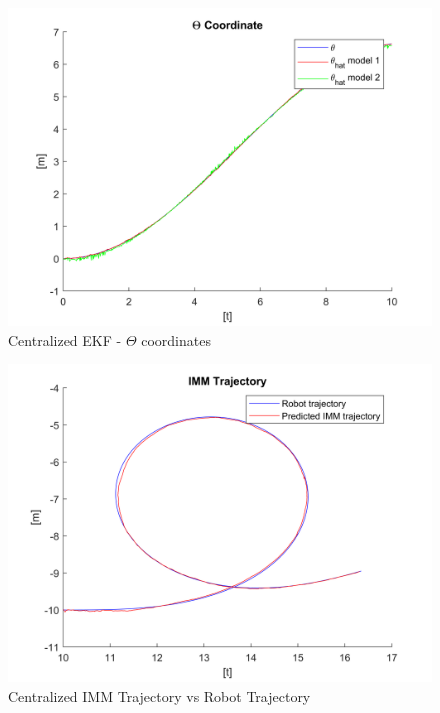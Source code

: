 \documentclass[conference]{IEEEtran}
\begin{document}
\begin{figure}[H]
 \includegraphics[width=\linewidth]{dwg/centralized-t-coord.png}
  \caption{Centralized EKF - $\Theta$ coordinates}
 
\end{figure}


\bigskip \bigskip \bigskip \bigskip \bigskip \bigskip \bigskip \bigskip \bigskip \bigskip \bigskip \bigskip \bigskip \bigskip \bigskip \bigskip 
\begin{figure}[H]
 \includegraphics[width=\linewidth]{dwg/Centralized-IMM-trj.png}
  \caption{Centralized IMM Trajectory vs Robot Trajectory}
 
\end{figure}
\end{document}
